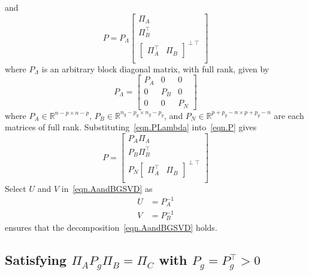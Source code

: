 and
\begin{equation}
  \label{eqn.P}
  P = P_{\Lambda}
  \begin{bmatrix}
    \Pi_{A} \\
    \Pi_{B}^{\top} \\
    \begin{bmatrix}
      \Pi_{A}^{\top} & \Pi_{B}
    \end{bmatrix}^{\perp\top} \\
  \end{bmatrix}
\end{equation}
where $P_{\Lambda}$ is an arbitrary block diagonal matrix, with full rank, given by
\begin{equation}
  \label{eqn.PLambda}
  P_{\Lambda} =
  \begin{bmatrix}
    P_{A} & 0 & 0 \\
    0 & P_{B} & 0 \\
    0 & 0 & P_{N}
  \end{bmatrix}
\end{equation}
where $P_{A}\in\mathbb{R}^{n-p\times n-p}$, $P_{B}\in\mathbb{R}^{n_{g}-p_{g}\times n_{g}-p_{g}}$, and $P_{N}\in\mathbb{R}^{p+p_{g}-n \times p+p_{g}-n}$ are each matrices of full rank.
Substituting\ \eqref{eqn.PLambda} into\ \eqref{eqn.P} gives
\begin{equation}
  \label{eqn.PP}
  P
  =
  \begin{bmatrix}
    P_{A}\Pi_{A} \\
    P_{B}\Pi_{B}^{\top} \\
    P_{N}
    \begin{bmatrix}
      \Pi_{A}^{\top} & \Pi_{B}
    \end{bmatrix}^{\perp\top} \\
  \end{bmatrix}
\end{equation}
Select $U$ and $V$ in\ \eqref{eqn.AandBGSVD} as
\begin{equation*}
  \begin{split}
    U &= P_{A}^{-1} \\
    V &= P_{B}^{-1}
  \end{split}
\end{equation*}
ensures that the decomposition\ \eqref{eqn.AandBGSVD} holds.

\subsection{Satisfying $\Pi_{A}P_{g}\Pi_{B}=\Pi_{C}$ with $P_{g}=P_{g}^{\top}>0$}

